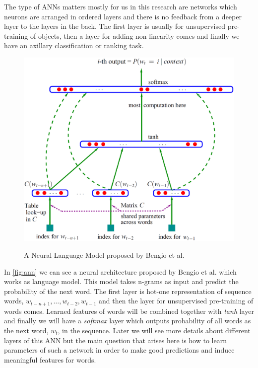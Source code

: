 The type of ANNs matters mostly for us in this research are
networks which neurons are arranged in ordered layers and there is no feedback
from a deeper layer  to the layers in the back. The first layer is usually for
unsupervised pre-training of objects, then a layer for adding non-linearity
comes and finally we have an axillary classification or ranking task.
 \begin{figure}[h!]
  \caption{A Neural Language Model proposed by Bengio et al.}
  \centering
    \includegraphics[width=1\textwidth]{ann.eps}
    \label{fig:ann}
\end{figure} 
 In \autoref{fig:ann}
 we can see a neural architecture proposed by Bengio et al. \cite{Bengio2003}
 which works as language model. This model takes n-grams as input and predict
 the probability of the next word. The first layer is hot-one representation of
 sequence words, $w_{t-n+1}, \ldots ,w_{t-2}, w_{t-1}$ and then the layer for
 unsupervised pre-training of words comes.
 Learned features of words will be combined together with \textit{tanh} layer
 and finally we will have a \textit{softmax} layer which outputs probability of
 all words as the next word, $w_t$, in the sequence. Later we will see more details about 
 different layers of this ANN but
 the main question that arises here is how to learn parameters of such a network
 in order to make good predictions and induce meaningful features for words.

